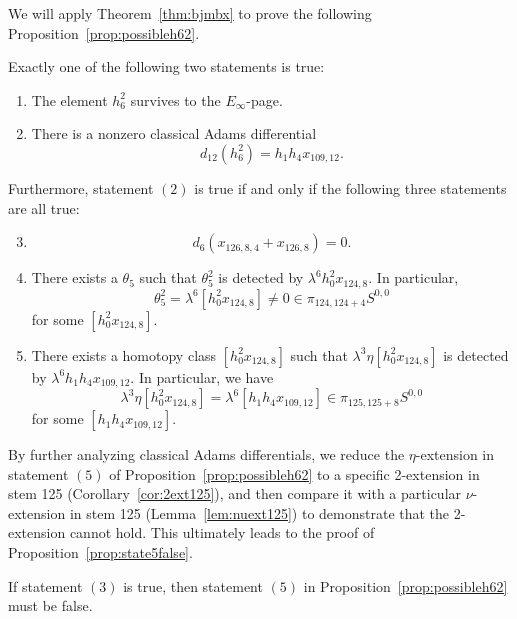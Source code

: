 \documentclass{amsart}
\numberwithin{equation}{section}
\begin{document}
We will apply Theorem~\ref{thm:bjmbx} to prove the following Proposition~\ref{prop:possibleh62}.

\begin{proposition} \label{prop:possibleh62}
Exactly one of the following two statements is true:
\begin{enumerate}
    \item The element $h_6^2$ survives to the $E_\infty$-page.
   
    \item There is a nonzero classical Adams differential 
    $$d_{12}(h_6^2) = h_1h_4x_{109,12}.$$
\end{enumerate}
Furthermore, statement $(2)$ is true if and only if the following three statements are all true:
\begin{enumerate} \setcounter{enumi}{2}
    \item \leavevmode\vspace*{-\dimexpr\abovedisplayskip + \baselineskip}  
    $$d_6(x_{126,8,4} + x_{126,8}) = 0.$$
    
    \item There exists a $\theta_5$ such that 
    $\theta_5^2$ is detected by $\lambda^6 h_0^2x_{124,8}$. In particular, 
    $$\theta_5^2 = \lambda^6 [h_0^2x_{124,8}] \neq 0 \in \pi_{124,124+4}S^{0,0}$$
    for some $[h_0^2x_{124,8}]$.

    \item There exists a homotopy class $[h_0^2x_{124,8}]$ such that
    $\lambda^3 \eta [h_0^2x_{124,8}]$ is detected by $\lambda^6 h_1h_4x_{109,12}$. In particular, we have 
    $$\lambda^3 \eta [h_0^2x_{124,8}] = \lambda^6 [h_1h_4x_{109,12}] \in \pi_{125,125+8} S^{0,0}$$
    for some $[h_1h_4x_{109,12}]$.
\end{enumerate}
\end{proposition}

By further analyzing classical Adams differentials, we reduce the $\eta$-extension in statement $(5)$ of Proposition~\ref{prop:possibleh62} to a specific 2-extension in stem 125 (Corollary~\ref{cor:2ext125}), and then compare it with a particular $\nu$-extension in stem 125 (Lemma~\ref{lem:nuext125}) to demonstrate that the 2-extension cannot hold. This ultimately leads to the proof of Proposition~\ref{prop:state5false}.

\begin{proposition} \label{prop:state5false}
    If statement $(3)$ is true, then statement $(5)$ in Proposition~\ref{prop:possibleh62} must be false.
\end{proposition}
\end{document}
